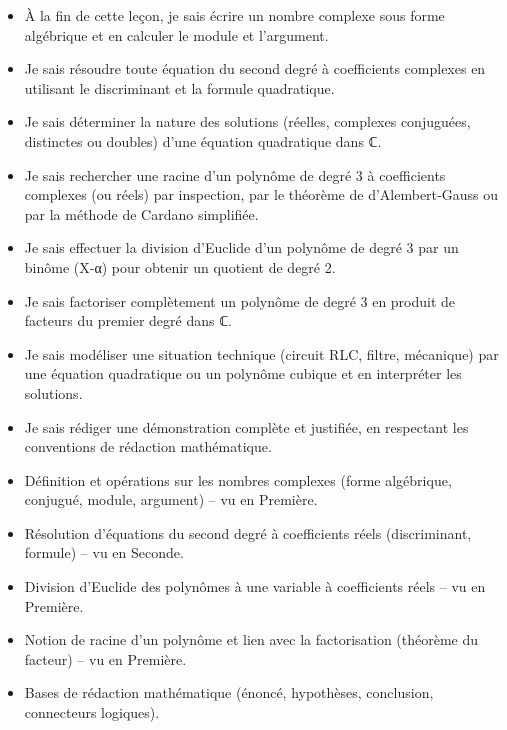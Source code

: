 \documentclass[11pt]{article}
\begin{document}
\begin{objectifs}
\begin{itemize}
\item À la fin de cette leçon, je sais écrire un nombre complexe sous forme algébrique et en calculer le module et l'argument.
\item Je sais résoudre toute équation du second degré à coefficients complexes en utilisant le discriminant et la formule quadratique.
\item Je sais déterminer la nature des solutions (réelles, complexes conjuguées, distinctes ou doubles) d'une équation quadratique dans ℂ.
\item Je sais rechercher une racine d'un polynôme de degré 3 à coefficients complexes (ou réels) par inspection, par le théorème de d'Alembert‑Gauss ou par la méthode de Cardano simplifiée.
\item Je sais effectuer la division d'Euclide d'un polynôme de degré 3 par un binôme (X‑α) pour obtenir un quotient de degré 2.
\item Je sais factoriser complètement un polynôme de degré 3 en produit de facteurs du premier degré dans ℂ.
\item Je sais modéliser une situation technique (circuit RLC, filtre, mécanique) par une équation quadratique ou un polynôme cubique et en interpréter les solutions.
\item Je sais rédiger une démonstration complète et justifiée, en respectant les conventions de rédaction mathématique.
\end{itemize}
\end{objectifs}

\begin{prerequis}
\begin{itemize}
\item Définition et opérations sur les nombres complexes (forme algébrique, conjugué, module, argument) – vu en Première.
\item Résolution d'équations du second degré à coefficients réels (discriminant, formule) – vu en Seconde.
\item Division d'Euclide des polynômes à une variable à coefficients réels – vu en Première.
\item Notion de racine d'un polynôme et lien avec la factorisation (théorème du facteur) – vu en Première.
\item Bases de rédaction mathématique (énoncé, hypothèses, conclusion, connecteurs logiques).
\end{itemize}
\end{prerequis}
\end{document}
